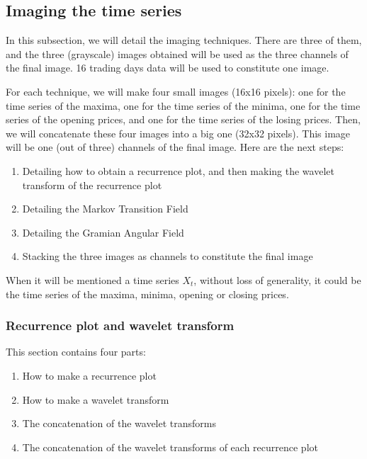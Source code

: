 \documentclass[11pt]{article}
\begin{document}
\begin{onehalfspace}
\subsection{Imaging the time series}

In this subsection, we will detail the imaging techniques. There are three of them, and the three (grayscale) images obtained will be used as the three channels of the final image. 16 trading days data will be used to constitute one image.

For each technique, we will make four small images (16x16 pixels): one for the time series of the maxima, one for the time series of the minima, one for the time series of the opening prices, and one for the time series of the losing prices. Then, we will concatenate these four images into a big one (32x32 pixels). This image will be one (out of three) channels of the final image. Here are the next steps:

\begin{enumerate}
    \item Detailing how to obtain a recurrence plot, and then making the wavelet transform of the recurrence plot
    \item Detailing the Markov Transition Field
    \item Detailing the Gramian Angular Field
    \item Stacking the three images as channels to constitute the final image
\end{enumerate}

When it will be mentioned a time series $X_t$, without loss of generality, it could be the time series of the maxima, minima, opening or closing prices. 

\subsubsection{Recurrence plot and wavelet transform}

This section contains four parts:

\begin{enumerate}
    \item How to make a recurrence plot
    \item How to make a wavelet transform
    \item The concatenation of the wavelet transforms
    \item The concatenation of the wavelet transforms of each recurrence plot 
\end{enumerate}


\end{onehalfspace}
\end{document}
